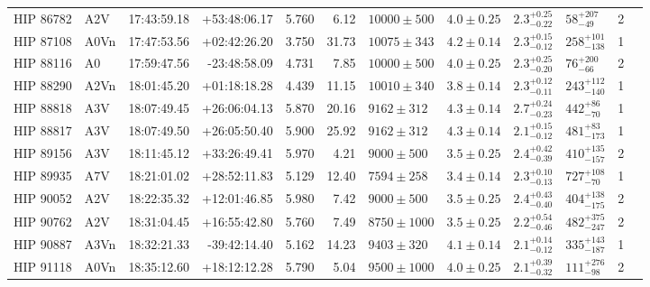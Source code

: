 \begin{tiny}
\begin{longtable}{|l|lrrrrllllll|}
   HIP 86782 &      A2V &    17:43:59.18 &   +53:48:06.17 &   5.760 &      6.12 &   $10000 \pm 500$ &  $4.0 \pm 0.25$ &  $2.3^{+0.25}_{-0.22}$ &     $58^{+207}_{-49}$ &       2 \\
   HIP 87108 &     A0Vn &    17:47:53.56 &   +02:42:26.20 &   3.750 &     31.73 &   $10075 \pm 343$ &  $4.2 \pm 0.14$ &  $2.3^{+0.15}_{-0.12}$ &   $258^{+101}_{-138}$ &       1 \\
   HIP 88116 &       A0 &    17:59:47.56 &   -23:48:58.09 &   4.731 &      7.85 &   $10000 \pm 500$ &  $4.0 \pm 0.25$ &  $2.3^{+0.25}_{-0.20}$ &     $76^{+200}_{-66}$ &       2 \\
   HIP 88290 &     A2Vn &    18:01:45.20 &   +01:18:18.28 &   4.439 &     11.15 &   $10010 \pm 340$ &  $3.8 \pm 0.14$ &  $2.3^{+0.12}_{-0.11}$ &   $243^{+112}_{-140}$ &       1 \\
   HIP 88818 &      A3V &    18:07:49.45 &   +26:06:04.13 &   5.870 &     20.16 &    $9162 \pm 312$ &  $4.3 \pm 0.14$ &  $2.7^{+0.24}_{-0.23}$ &     $442^{+86}_{-70}$ &       1 \\
   HIP 88817 &      A3V &    18:07:49.50 &   +26:05:50.40 &   5.900 &     25.92 &    $9162 \pm 312$ &  $4.3 \pm 0.14$ &  $2.1^{+0.15}_{-0.12}$ &    $481^{+83}_{-173}$ &       1 \\
   HIP 89156 &      A3V &    18:11:45.12 &   +33:26:49.41 &   5.970 &      4.21 &    $9000 \pm 500$ &  $3.5 \pm 0.25$ &  $2.4^{+0.42}_{-0.39}$ &   $410^{+135}_{-157}$ &       2 \\
   HIP 89935 &      A7V &    18:21:01.02 &   +28:52:11.83 &   5.129 &     12.40 &    $7594 \pm 258$ &  $3.4 \pm 0.14$ &  $2.3^{+0.10}_{-0.13}$ &    $727^{+108}_{-70}$ &       1 \\
   HIP 90052 &      A2V &    18:22:35.32 &   +12:01:46.85 &   5.980 &      7.42 &    $9000 \pm 500$ &  $3.5 \pm 0.25$ &  $2.4^{+0.43}_{-0.40}$ &   $404^{+138}_{-175}$ &       2 \\
   HIP 90762 &      A2V &    18:31:04.45 &   +16:55:42.80 &   5.760 &      7.49 &   $8750 \pm 1000$ &  $3.5 \pm 0.25$ &  $2.2^{+0.54}_{-0.46}$ &   $482^{+375}_{-247}$ &       2 \\
   HIP 90887 &     A3Vn &    18:32:21.33 &   -39:42:14.40 &   5.162 &     14.23 &    $9403 \pm 320$ &  $4.1 \pm 0.14$ &  $2.1^{+0.14}_{-0.12}$ &   $335^{+143}_{-187}$ &       1 \\
   HIP 91118 &     A0Vn &    18:35:12.60 &   +18:12:12.28 &   5.790 &      5.04 &   $9500 \pm 1000$ &  $4.0 \pm 0.25$ &  $2.1^{+0.39}_{-0.32}$ &    $111^{+276}_{-98}$ &       2 \\

\end{longtable}
\end{tiny}
